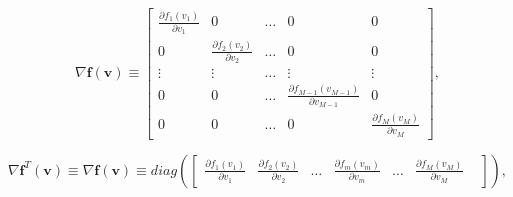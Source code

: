 \begin{equation}
\nabla\mathbf{f}(\mathbf{v}) 
\equiv
\begin{bmatrix}
\frac{\partial f_{1}(v_{1})}{\partial v_{1}} & 0  & \dots & 0      & 0\\
0  & \frac{\partial f_{2}(v_{2})}{\partial v_{2}} & \dots & 0      & 0\\
\vdots                  & \vdots                  & \dots & \vdots & \vdots\\
0                       & 0                       & \dots & \frac{\partial f_{M-1}(v_{M-1})}{\partial v_{M-1}} & 0\\
0                       & 0                       & \dots & 0      & \frac{\partial f_{M}(v_{M})}{\partial v_{M}}
\end{bmatrix},
\end{equation}

\begin{equation}
\nabla \mathbf{f}^{T}(\mathbf{v}) 
\equiv
\nabla \mathbf{f}(\mathbf{v}) 
\equiv
diag
\left(
\begin{bmatrix}
\frac{\partial f_{1}(v_{1})}{\partial v_{1}} &
\frac{\partial f_{2}(v_{2})}{\partial v_{2}} &
\dots&
\frac{\partial f_{m}(v_{m})}{\partial v_{m}} &
\dots&
\frac{\partial f_{M}(v_{M})}{\partial v_{M}} &
\end{bmatrix}
\right),
\end{equation}

